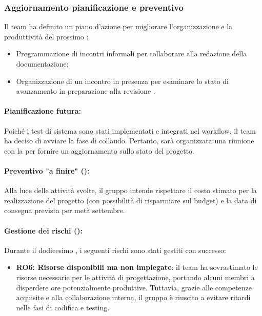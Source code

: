 \subsubsection{Aggiornamento pianificazione e preventivo}
\par Il team ha definito un piano d'azione per migliorare l'organizzazione e la produttività del prossimo :
\begin{itemize}
  \item Programmazione di incontri informali per collaborare alla redazione della documentazione;
  \item Organizzazione di un incontro in presenza per esaminare lo stato di avanzamento in preparazione alla revisione .
\end{itemize}

\paragraph*{Pianificazione futura:}
\par Poiché i test di sistema sono stati implementati e integrati nel workflow, il team ha deciso di avviare la fase di collaudo. Pertanto, sarà organizzata una riunione con la  per fornire un aggiornamento sullo stato del progetto.

\paragraph*{Preventivo "a finire" ():}
\par Alla luce delle attività svolte, il gruppo intende rispettare il costo stimato per la realizzazione del progetto (con possibilità di risparmiare sul budget) e la data di consegna prevista per metà settembre.

\paragraph*{Gestione dei rischi ():}
\par Durante il dodicesimo , i seguenti rischi sono stati gestiti con successo:
\begin{itemize}
  \item \textbf{RO6: Risorse disponibili ma non impiegate}: il team ha sovrastimato le risorse necessarie per le attività di progettazione, portando alcuni membri a disperdere ore potenzialmente produttive. Tuttavia, grazie alle competenze acquisite e alla collaborazione interna, il gruppo è riuscito a evitare ritardi nelle fasi di codifica e testing.
\end{itemize}
